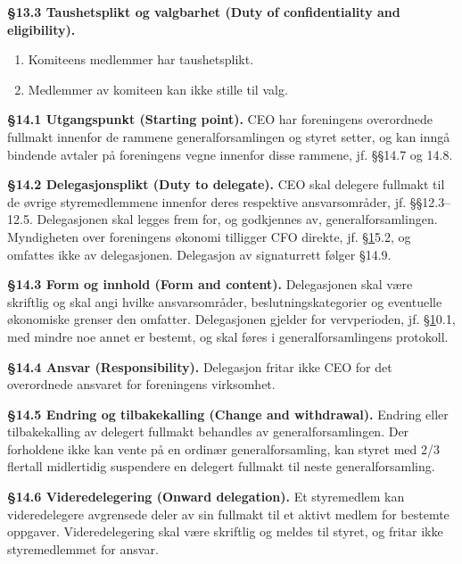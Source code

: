 \documentclass{../../../Common/Latex/Templates/rapport}
\begin{document}
\textbf{\S 13.3 Taushetsplikt og valgbarhet (Duty of confidentiality and eligibility).}\label{bylaw:13.3}
\begin{enumerate}
  \item Komiteens medlemmer har taushetsplikt.
  \item Medlemmer av komiteen kan ikke stille til valg.
\end{enumerate}


\label{bylaw:14}
\textbf{\S 14.1 Utgangspunkt (Starting point).}\label{bylaw:14.1} CEO har foreningens overordnede fullmakt innenfor de rammene generalforsamlingen og styret setter, og kan inngå bindende avtaler på foreningens vegne innenfor disse rammene, jf. \S\S14.7 og 14.8.

\textbf{\S 14.2 Delegasjonsplikt (Duty to delegate).}\label{bylaw:14.2} CEO skal delegere fullmakt til de øvrige styremedlemmene innenfor deres respektive ansvarsområder, jf. \S\S12.3--12.5. Delegasjonen skal legges frem for, og godkjennes av, generalforsamlingen. Myndigheten over foreningens økonomi tilligger CFO direkte, jf. \hyperref[bylaw:1]{\S 1}5.2, og omfattes ikke av delegasjonen. Delegasjon av signaturrett følger \S14.9.

\textbf{\S 14.3 Form og innhold (Form and content).}\label{bylaw:14.3} Delegasjonen skal være skriftlig og skal angi hvilke ansvarsområder, beslutningskategorier og eventuelle økonomiske grenser den omfatter. Delegasjonen gjelder for vervperioden, jf. \hyperref[bylaw:1]{\S 1}0.1, med mindre noe annet er bestemt, og skal føres i generalforsamlingens protokoll.

\textbf{\S 14.4 Ansvar (Responsibility).}\label{bylaw:14.4} Delegasjon fritar ikke CEO for det overordnede ansvaret for foreningens virksomhet.

\textbf{\S 14.5 Endring og tilbakekalling (Change and withdrawal).}\label{bylaw:14.5} Endring eller tilbakekalling av delegert fullmakt behandles av generalforsamlingen. Der forholdene ikke kan vente på en ordinær generalforsamling, kan styret med 2/3 flertall midlertidig suspendere en delegert fullmakt til neste generalforsamling.

\textbf{\S 14.6 Videredelegering (Onward delegation).}\label{bylaw:14.6} Et styremedlem kan videredelegere avgrensede deler av sin fullmakt til et aktivt medlem for bestemte oppgaver. Videredelegering skal være skriftlig og meldes til styret, og fritar ikke styremedlemmet for ansvar.
\end{document}
